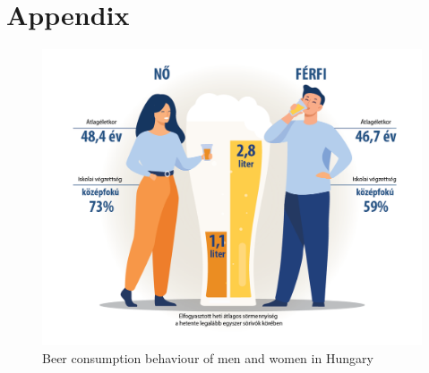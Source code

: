 \section*{Appendix}
\begin{figure}[H]
  \centering
  \includegraphics[width=0.65\linewidth]{pics/ksh.png}
  \caption{Beer consumption behaviour of men and women in Hungary \cite{ksh2}}
  \label{fig:ksh}
\end{figure}


